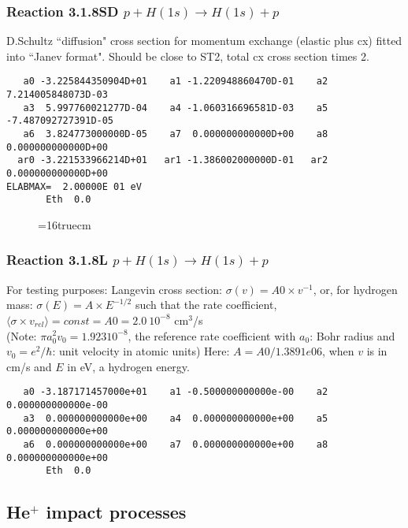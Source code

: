 \documentclass[12pt,dvipdfmx]{article}
\begin{document}
\subsubsection{
Reaction 3.1.8SD $  p + H(1s) \rightarrow H(1s) + p  $
}
D.Schultz ``diffusion" cross section for momentum exchange (elastic plus cx)
fitted into ``Janev format". Should be close to ST2, total cx cross section times 2.

\begin{small}\begin{verbatim}
   a0 -3.225844350904D+01    a1 -1.220948860470D-01    a2  7.214005848073D-03
   a3  5.997760021277D-04    a4 -1.060316696581D-03    a5 -7.487092727391D-05
   a6  3.824773000000D-05    a7  0.000000000000D+00    a8  0.000000000000D+00
  ar0 -3.221533966214D+01   ar1 -1.386002000000D-01   ar2  0.000000000000D+00
ELABMAX=  2.00000E 01 eV
       Eth  0.0
\end{verbatim}\end{small}


\begin{figure} \label{318RS}
\epsfxsize=16truecm
\end{figure}
\newpage
\subsubsection{
Reaction 3.1.8L $  p + H(1s) \rightarrow H(1s) + p  $
}
For testing purposes:
Langevin cross section: $\sigma(v)=A0 \times v^{-1}$, or, for hydrogen mass: $\sigma(E)=A \times E^{-1/2}$
such that the rate coefficient,
$\langle\sigma \times v_{rel} \rangle= const = A0 = 2.0~ 10^{-8}$ cm$^3$/s\\
(Note: $\pi a_0^2 v_0 = 1.923 10^{-8}$, the reference rate coefficient with $a_0$: Bohr radius
and $v_0 =e^2/\hbar$: unit velocity in atomic units)
Here: $A = A0/1.3891e 06$, when $v$ is in cm/s and $E$ in eV, a hydrogen energy.

\begin{small}\begin{verbatim}
   a0 -3.187171457000e+01    a1 -0.500000000000e-00    a2  0.000000000000e-00
   a3  0.000000000000e+00    a4  0.000000000000e+00    a5  0.000000000000e+00
   a6  0.000000000000e+00    a7  0.000000000000e+00    a8  0.000000000000e+00
       Eth  0.0
\end{verbatim}\end{small}

\newpage
\subsection{He$^+$ impact processes}
\end{document}
